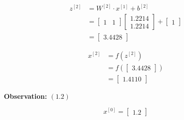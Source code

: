 \documentclass[12pt]{article}
\begin{document}
\begin{enumerate}[leftmargin=\labelsep]
\begin{paracol}{3}
              $$
                  \begin{aligned}
                      z^{[2]} & = W^{[2]} \cdot x^{[1]} + b^{[2]} \\
                              & = \begin{bmatrix}
                                      1 &
                                      1
                                  \end{bmatrix}
                      \begin{bmatrix}
                          1.2214 \\
                          1.2214
                      \end{bmatrix}
                      +
                      \begin{bmatrix}
                          1
                      \end{bmatrix}                              \\
                              & = \begin{bmatrix}{}
                                      3.4428
                                  \end{bmatrix}
                  \end{aligned}
              $$

              $$
                  \begin{aligned}
                      x^{[2]} & = f(z^{[2]})                  \\
                              & = f\left(\begin{bmatrix}{}
                                                 3.4428
                                             \end{bmatrix}\right) \\
                              & = \begin{bmatrix}{}
                                      1.4110
                                  \end{bmatrix}
                  \end{aligned}
              $$

              \switchcolumn

              \begin{center}
                  \textbf{Observation: $(1.2)$}
              \end{center}

              $$
                  x^{[0]} = \begin{bmatrix}
                      1.2
                  \end{bmatrix}
              $$


\end{paracol}
\end{enumerate}
\end{document}
